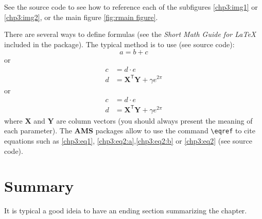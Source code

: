 See the source code to see how to reference each of the subfigures \ref{chp3:img1} or \ref{chp3:img2}, or the main figure \ref{fig:rmain figure}.

There are several ways to define formulas (see the \textit{Short Math Guide for LaTeX} included in the package). The typical method is to use (see source code): 
\begin{equation}
a= b + c
\end{equation}
or
\begin{align}
c &= d \cdot e \nonumber\\
d &= \mathbf{X}^{\mathsf{T}} \mathbf{Y}+ \gamma e^{2\pi}
\label{chp3:eq1} 
\end{align}
or
\begin{subequations}
\begin{align}
c &= d \cdot e \label{chp3:eq2:a} \\
d &= \mathbf{X}^{\mathsf{T}} \mathbf{Y} + \gamma e^{2\pi}
\label{chp3:eq2:b} 
\end{align}
\label{chp3:eq2} 
\end{subequations}
where $\mathbf{X}$ and $\mathbf{Y}$ are column vectors (you should always present the meaning of each parameter). The \textbf{AMS} packages allow to use the command \verb"\eqref" to cite equations such as \eqref{chp3:eq1},  \eqref{chp3:eq2:a},\eqref{chp3:eq2:b} or \eqref{chp3:eq2} (see source code).

\section{Summary}

It is typical a good ideia to have an ending section summarizing the chapter.

\cleardoublepage
 

